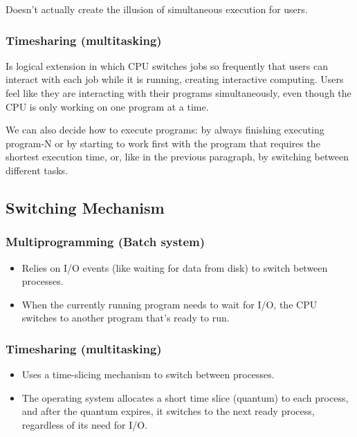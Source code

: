Doesn't actually create the illusion of simultaneous execution for users.

\subsubsection{Timesharing (multitasking)}

Is logical extension in which CPU switches jobs so frequently that users can interact with each job while it is running, creating
interactive computing.
Users feel like they are interacting with their programs simultaneously, even though the CPU is only working on one program at a time.

We can also decide how to execute programs: by always finishing executing program-N or by starting to work first with the program that requires  the shortest execution time, or, like in the previous paragraph, by switching between different tasks.

\subsection{Switching Mechanism}

\subsubsection{Multiprogramming (Batch system)}

\begin{itemize}
    \item Relies on I/O events (like waiting for data from disk) to switch between processes.
    \item When the currently running program needs to wait for I/O, the CPU switches to another program that's ready to run.
\end{itemize}

\subsubsection{Timesharing (multitasking)}

\begin{itemize}
    \item Uses a time-slicing mechanism to switch between processes.
    \item The operating system allocates a short time slice (quantum) to each process, and after the quantum expires, it switches to the next ready process, regardless of its need for I/O.
\end{itemize}

